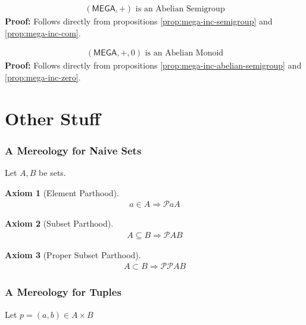 \documentclass[runningheads,a4paper]{llncs}
\newtheorem{axiom}{Axiom}
\newcommand{\MEGA}{\mathsf{MEGA}}
\begin{document}
\begin{proposition}
\label{prop:mega-inc-abelian-semigroup}
\begin{align}
(\MEGA,+) \text{ is an Abelian Semigroup}
\end{align}
\textbf{Proof:}
Follows directly from propositions \ref{prop:mega-inc-semigroup} and \ref{prop:mega-inc-com}.
\end{proposition}

\begin{proposition}
\label{prop:mega-inc-abelian-monoid}
\begin{align}
(\MEGA,+,0) \text{ is an Abelian Monoid}
\end{align}
\textbf{Proof:}
Follows directly from propositions \ref{prop:mega-inc-abelian-semigroup} and \ref{prop:mega-inc-zero}.
\end{proposition}

\section{Other Stuff}

\subsubsection{A Mereology for Naive Sets}
Let $A,B$ be sets.
\begin{axiom}[Element Parthood]
\begin{align}
a \in A \Rightarrow \mathcal{P} a A
\end{align}
\end{axiom}

\begin{axiom}[Subset Parthood]
\begin{align}
A \subseteq B \Rightarrow \mathcal{P} A B
\end{align}
\end{axiom}

\begin{axiom}[Proper Subset Parthood]
\begin{align}
A \subset B \Rightarrow \mathcal{PP} A B
\end{align}
\end{axiom}


\subsubsection{A Mereology for Tuples}
Let $p = (a,b) \in A \times B$
\end{document}
